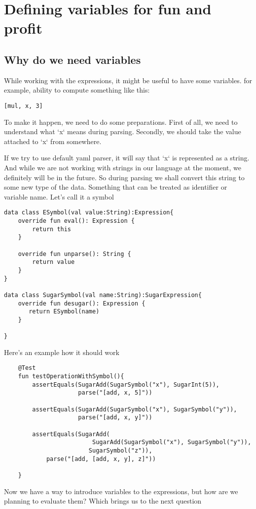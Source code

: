 \documentclass[11pt]{article}
\begin{document}
\section{Defining variables for fun and profit}
\label{sec:orge46e55c}
\subsection{Why do we need variables}
\label{sec:org98ac530}
While working with the expressions, it might be useful to have some variables.
for example, ability to compute something like this:
\begin{verbatim}
[mul, x, 3]
\end{verbatim}
To make it happen, we need to do some preparations.
First of all, we need to understand what `x` means during parsing.
Secondly, we should take the value attached to `x` from somewhere.

If we try to use default yaml parser, it will say that `x` is represented as a string.
And while we are not working with strings in our language at the moment, we definitely will be in the future.
So during parsing we shall convert this string to some new type of the data.
Something that can be treated as identifier or variable name. Let's call it a symbol

\begin{verbatim}
data class ESymbol(val value:String):Expression{
    override fun eval(): Expression {
        return this
    }

    override fun unparse(): String {
        return value
    }
}

data class SugarSymbol(val name:String):SugarExpression{
    override fun desugar(): Expression {
       return ESymbol(name)
    }

}
\end{verbatim}
Here's an example how it should work
\begin{verbatim}
    @Test
    fun testOperationWithSymbol(){
        assertEquals(SugarAdd(SugarSymbol("x"), SugarInt(5)),
                     parse("[add, x, 5]"))

        assertEquals(SugarAdd(SugarSymbol("x"), SugarSymbol("y")),
                     parse("[add, x, y]"))

        assertEquals(SugarAdd(
                         SugarAdd(SugarSymbol("x"), SugarSymbol("y")),
                        SugarSymbol("z")),
            parse("[add, [add, x, y], z]"))

    }
\end{verbatim}
Now we have a way to introduce variables to the expressions, but how are we planning to evaluate them?
Which brings us to the next question
\end{document}
